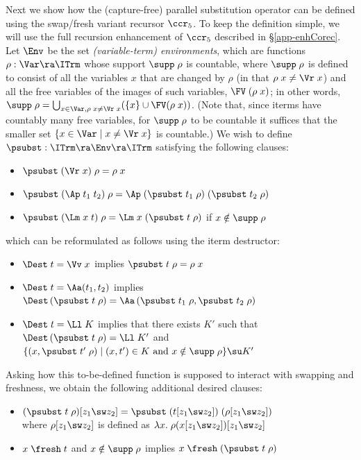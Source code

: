 Next we show how the (capture-free) parallel substitution operator can be defined using the swap/fresh variant recursor $\ccr_5$. To keep the definition simple, we will use the full recursion enhancement of $\ccr_5$ described in \S\ref{app-enhCorec}. Let $\Env$ be the set \emph{(variable-term) environments}, which are functions $\rho:\Var \ra \ITrm$ whose support $\supp\;\rho$ is countable, where  $\supp\;\rho$ is defined to consist of all the variables $x$ that are changed by $\rho$ (in that $\rho\;x \not= \Vr\;x$) and all the free variables of the images of such variables, $\FV\;(\rho\;x)$; in other words, $\supp\;\rho = \bigcup_{x\in\Var,\rho\;x\not=\Vr\;x} (\{x\} \cup \FV(\rho\;x))$. (Note that, since iterms have countably many free variables, for $\supp\;\rho$ to be countable it suffices that the smaller set $\{x\in\Var \mid x\not=\Vr\;x\}$ is countable.) 
%
We wish to define $\psubst : \ITrm \ra  \Env \ra \ITrm$ satisfying the following clauses:
\begin{itemize}
	\item[(1')] $\psubst\;(\Vr\;x)\;\rho = \rho\;x$
	\item[(2')] $\psubst\;(\Ap\;t_1\;t_2)\;\rho = \Ap\;(\psubst\;t_1\;\rho)\;(\psubst\;t_2\;\rho)$
	\item[(3')] $\psubst\;(\Lm\;x\;t)\;\rho = \Lm\;x\;(\psubst\;t\;\rho)$ if $x\notin\supp\;\rho$ 
\end{itemize}
which can be reformulated as follows using the iterm destructor: 
\begin{itemize}
	\item[(1)] $\Dest\;t = \Vv\;x$ implies 
	$\psubst\;t\;\rho = \rho\;x$
	\item[(2)] $\Dest\;t = \Aa(t_1,t_2)$ implies 
	$\Dest\,(\psubst\;t\;\rho) = \Aa\, (\psubst\;t_1\;\rho,\psubst\;t_2\;\rho)$
	\item[(3)] $\Dest\;t = \Ll\;K$ implies that there exists $K'$ such that
	$\Dest\,(\psubst\;t\;\rho) = \Ll\;K'$ and $
	\{ (x,\psubst\;t'\;\rho) \mid   (x,t') \in K \mbox{ and } x\notin\supp\;\rho\} \su K'$ 
\end{itemize}
%
Asking how this to-be-defined function is supposed to interact with swapping and freshness, we obtain the following additional desired clauses:
\begin{itemize}
	\item[(4)] $(\psubst\;t\;\rho)[z_1\sw z_2] = 
	\psubst\;(t[z_1\sw z_2])\;(\rho[z_1\sw z_2])$ 
	\\where $\rho[z_1\sw z_2]$ is defined as $ \lambda x.\;\rho(x[z_1\sw z_2])[z_1\sw z_2]$ 
    \item[(5)] $x\;\fresh\;t$ and $x\notin\supp\;\rho$ implies 
    $x\;\fresh\;(\psubst\;t\;\rho)$
\end{itemize}

